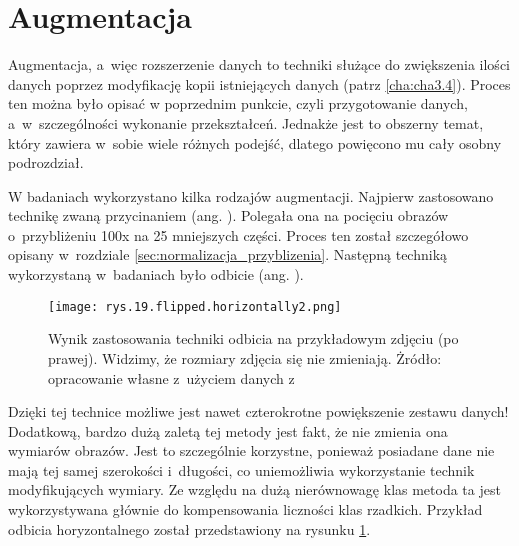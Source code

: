 \section{Augmentacja}
\label{sec:augmentacja}

Augmentacja, a~więc rozszerzenie danych to techniki służące do zwiększenia ilości danych poprzez modyfikację kopii istniejących danych (patrz \ref{cha:cha3.4}). Proces ten można było opisać w poprzednim punkcie, czyli przygotowanie danych, a~w~szczególności wykonanie przekształceń. Jednakże jest to obszerny temat, który zawiera w~sobie wiele różnych podejść, dlatego powięcono mu cały osobny podrozdział. 

W badaniach wykorzystano kilka rodzajów augmentacji. Najpierw zastosowano technikę zwaną przycinaniem (ang. ). Polegała ona na pocięciu obrazów o~przybliżeniu 100x na 25 mniejszych części. Proces ten został szczegółowo opisany w~rozdziale \ref{sec:normalizacja_przyblizenia}. Następną techniką wykorzystaną w~badaniach było odbicie (ang. ).
\begin{figure}[h]
    \centering
    \texttt{[image: rys.19.flipped.horizontally2.png]}
    \caption{Wynik zastosowania techniki odbicia na przykładowym zdjęciu (po prawej). Widzimy, że rozmiary zdjęcia się nie zmieniają.  Żródło: opracowanie własne z~użyciem danych z~\cite{Pirowski17}}
    \label{fig:mesh19}
\end{figure}
Dzięki tej technice możliwe jest nawet czterokrotne powiększenie zestawu danych! Dodatkową, bardzo dużą zaletą tej metody jest fakt, że nie zmienia ona wymiarów obrazów. Jest to szczególnie korzystne, ponieważ posiadane  dane nie mają tej samej szerokości i~długości, co uniemożliwia wykorzystanie technik modyfikujących wymiary. Ze względu na dużą nierównowagę klas metoda ta jest wykorzystywana głównie do kompensowania liczności klas rzadkich. Przykład odbicia horyzontalnego został przedstawiony na rysunku \ref{fig:mesh19}.
















